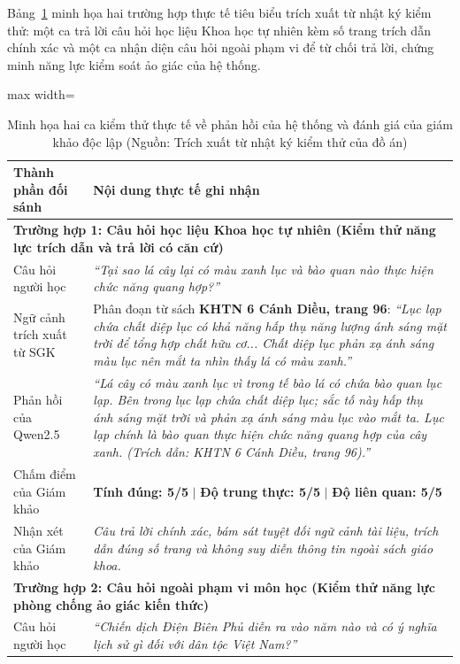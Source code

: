 Bảng~\ref{tab:case_study} minh họa hai trường hợp thực tế tiêu biểu trích xuất từ nhật ký kiểm thử: một ca trả lời câu hỏi học liệu Khoa học tự nhiên kèm số trang trích dẫn chính xác và một ca nhận diện câu hỏi ngoài phạm vi để từ chối trả lời, chứng minh năng lực kiểm soát ảo giác của hệ thống.

\begin{table}[H]
\centering
\caption{Minh họa hai ca kiểm thử thực tế về phản hồi của hệ thống và đánh giá của giám khảo độc lập (Nguồn: Trích xuất từ nhật ký kiểm thử của đồ án)}
\label{tab:case_study}
\small
\begin{adjustbox}{max width=\textwidth}
\begin{tabular}{p{3.5cm}p{11.5cm}}
\toprule
\textbf{Thành phần đối sánh} & \textbf{Nội dung thực tế ghi nhận} \\
\midrule
\multicolumn{2}{l}{\textbf{Trường hợp 1: Câu hỏi học liệu Khoa học tự nhiên (Kiểm thử năng lực trích dẫn và trả lời có căn cứ)}} \\
\addlinespace[2pt]
Câu hỏi người học & \textit{``Tại sao lá cây lại có màu xanh lục và bào quan nào thực hiện chức năng quang hợp?''} \\
Ngữ cảnh trích xuất từ SGK & Phân đoạn từ sách \textbf{KHTN 6 Cánh Diều, trang 96}: \textit{``Lục lạp chứa chất diệp lục có khả năng hấp thụ năng lượng ánh sáng mặt trời để tổng hợp chất hữu cơ... Chất diệp lục phản xạ ánh sáng màu lục nên mắt ta nhìn thấy lá có màu xanh.''} \\
Phản hồi của Qwen2.5 & \textit{``Lá cây có màu xanh lục vì trong tế bào lá có chứa bào quan lục lạp. Bên trong lục lạp chứa chất diệp lục; sắc tố này hấp thụ ánh sáng mặt trời và phản xạ ánh sáng màu lục vào mắt ta. Lục lạp chính là bào quan thực hiện chức năng quang hợp của cây xanh. (Trích dẫn: KHTN 6 Cánh Diều, trang 96).''} \\
Chấm điểm của Giám khảo & \textbf{Tính đúng: 5/5} $\mid$ \textbf{Độ trung thực: 5/5} $\mid$ \textbf{Độ liên quan: 5/5} \\
Nhận xét của Giám khảo & \textit{Câu trả lời chính xác, bám sát tuyệt đối ngữ cảnh tài liệu, trích dẫn đúng số trang và không suy diễn thông tin ngoài sách giáo khoa.} \\
\midrule
\multicolumn{2}{l}{\textbf{Trường hợp 2: Câu hỏi ngoài phạm vi môn học (Kiểm thử năng lực phòng chống ảo giác kiến thức)}} \\
\addlinespace[2pt]
Câu hỏi người học & \textit{``Chiến dịch Điện Biên Phủ diễn ra vào năm nào và có ý nghĩa lịch sử gì đối với dân tộc Việt Nam?''} \\

\end{tabular}
\end{adjustbox}
\end{table}
